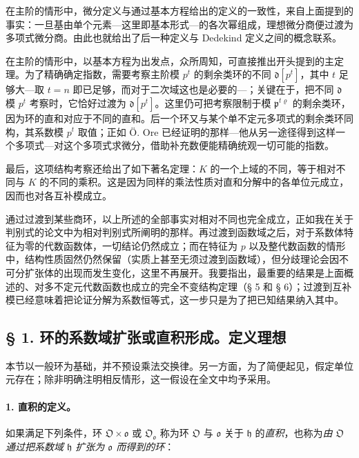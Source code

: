 在主阶的情形中，微分定义与通过基本方程给出的定义的一致性，来自上面提到的事实：一旦基由单个元素---这里即基本形式---的各次幂组成，理想微分商便过渡为多项式微分商。由此也就给出了后一种定义与 Dedekind 定义之间的概念联系。

在主阶的情形中，以基本方程为出发点，众所周知，可直接推出开头提到的主定理。为了精确确定指数，需要考察主阶模 \(p^t\) 的剩余类环的不同 \(\mathfrak d[p^t]\)，其中 \(t\) 足够大---取 \(t=n\) 即已足够，而对于二次域这也是必要的---；关键在于，把不同 \(\mathfrak d\) 模 \(p^t\) 考察时，它恰好过渡为 \(\mathfrak d[p^t]\)。这里仍可把考察限制于模 \(\mathfrak p^{t\varrho}\) 的剩余类环，因为环的直和对应于不同的直和。后一个环又与某个单不定元多项式的剩余类环同构，其系数模 \(p^t\) 取值；正如 Ö. Ore 已经证明的那样---他从另一途径得到这样一个多项式---对这个多项式求微分，借助补充数便能精确统观一切可能的指数。

最后，这项结构考察还给出了如下著名定理：\(K\) 的一个上域的不同，等于相对不同与 \(K\) 的不同的乘积。这是因为同样的乘法性质对直和分解中的各单位元成立，因而也对各互补模成立。

通过过渡到某些商环，以上所述的全部事实对相对不同也完全成立，正如我在关于判别式的论文中为相对判别式所阐明的那样。再过渡到函数域之后，对于系数体特征为零的代数函数体，一切结论仍然成立；而在特征为 \(p\) 以及整代数函数的情形中，结构性质固然仍然保留（实质上甚至无须过渡到函数域），但分歧理论会因不可分扩张体的出现而发生变化，这里不再展开。我要指出，最重要的结果是上面概述的、对多不定元代数函数也成立的完全不变结构定理（§ 5 和 § 6）；过渡到互补模已经意味着把论证分解为系数恒等式，这一步只是为了把已知结果纳入其中。
\subsection*{§ 1. 环的系数域扩张或直积形成。定义理想}

本节以一般环为基础，并不预设乘法交换律。另一方面，为了简便起见，假定单位元存在；除非明确注明相反情形，这一假设在全文中均予采用。

\paragraph{1. 直积的定义。}
如果满足下列条件，环 \(\mathfrak O\times\mathfrak o\) 或 \(\mathfrak O_{\mathfrak o}\) 称为环 \(\mathfrak O\) 与 \(\mathfrak o\) 关于 \(\mathfrak h\) 的\emph{直积}，也称为\emph{由 \(\mathfrak O\) 通过把系数域 \(\mathfrak h\) 扩张为 \(\mathfrak o\) 而得到的环}：

